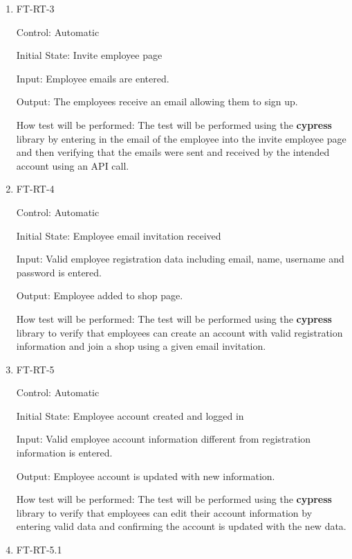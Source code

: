 \documentclass[12pt, titlepage]{article}
\begin{document}
\begin{enumerate}

\item{FT-RT-3\\}

Control: Automatic
					
Initial State: Invite employee page
					
Input: Employee emails are entered.
					
Output: The employees receive an email allowing them to sign up.

How test will be performed: The test will be performed using the \textbf{cypress} library by entering in the email of the employee into the invite employee page and then verifying that the emails were sent and received by the intended account using an API call.


\item{FT-RT-4\\}

Control: Automatic
					
Initial State: Employee email invitation received
					
Input: Valid employee registration data including email, name, username and password is entered.
					
Output: Employee added to shop page.

How test will be performed: The test will be performed using the \textbf{cypress} library to verify that employees can create an account with valid registration information and join a shop using a given email invitation.

\item{FT-RT-5\\}

Control: Automatic
					
Initial State: Employee account created and logged in
					
Input: Valid employee account information different from registration information is entered.
					
Output: Employee account is updated with new information.

How test will be performed: The test will be performed using the \textbf{cypress} library to verify that employees can edit their account information by entering valid data and confirming the account is updated with the new data.

\item{FT-RT-5.1\\}


\end{enumerate}
\end{document}
